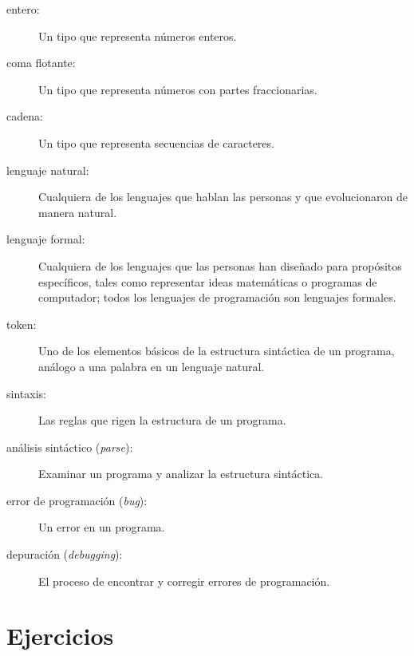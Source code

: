 \documentclass[10pt]{book}
\begin{document}
\begin{description}
\item[entero:] Un tipo que representa números enteros.

\item[coma flotante:] Un tipo que representa números con partes
fraccionarias.

\item[cadena:] Un tipo que representa secuencias de caracteres.

\item[lenguaje natural:]  Cualquiera de los lenguajes que hablan las personas y
que evolucionaron de manera natural.

\item[lenguaje formal:]  Cualquiera de los lenguajes que las personas han diseñado
para propósitos específicos, tales como representar ideas matemáticas o
programas de computador; todos los lenguajes de programación son lenguajes formales.

\item[token:]  Uno de los elementos básicos de la estructura sintáctica de
un programa, análogo a una palabra en un lenguaje natural.

\item[sintaxis:] Las reglas que rigen la estructura de un programa.

\item[análisis sintáctico ({\em parse}):] Examinar un programa y analizar la
estructura sintáctica.

\item[error de programación ({\em bug}):] Un error en un programa.

\item[depuración ({\em debugging}):] El proceso de encontrar y corregir
errores de programación.

\end{description}


\section{Ejercicios}
\end{document}
